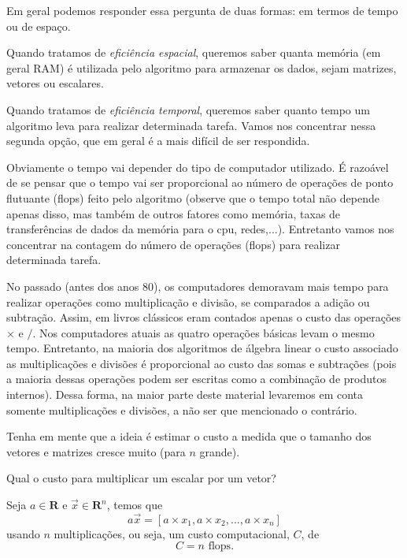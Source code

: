 Em geral podemos responder essa pergunta de duas formas: em termos de tempo ou de espaço.

Quando tratamos de \emph{eficiência espacial}, queremos saber quanta memória (em geral RAM) é utilizada pelo algoritmo para armazenar os dados, sejam matrizes, vetores ou escalares.

Quando tratamos de \emph{eficiência temporal}, queremos saber quanto tempo um algoritmo leva para realizar determinada tarefa. Vamos nos concentrar nessa segunda opção, que em geral é a mais difícil de ser respondida.

Obviamente o tempo vai depender do tipo de computador utilizado. É razoável de se pensar que o tempo vai ser proporcional ao número de operações de ponto flutuante (flops) feito pelo algoritmo (observe que o tempo total não depende apenas disso, mas também de outros fatores como memória, taxas de transferências de dados da memória para o cpu, redes,...). Entretanto vamos nos concentrar na contagem do número de operações (flops) para realizar determinada tarefa.

No passado (antes dos anos 80), os computadores demoravam mais tempo para realizar operações como multiplicação e divisão, se comparados a adição ou subtração. Assim, em livros clássicos eram contados apenas o custo das operações $\times$ e $/$. Nos computadores atuais as quatro operações básicas  levam o mesmo tempo. Entretanto, na maioria dos algoritmos de álgebra linear o custo associado as multiplicações e divisões é proporcional ao custo das somas e subtrações (pois a maioria dessas operações podem ser escritas como a combinação de produtos internos). Dessa forma, na maior parte deste material levaremos em conta somente multiplicações e divisões, a não ser que mencionado o contrário.

Tenha em mente que a ideia é estimar o custo a medida que o tamanho dos vetores e matrizes cresce muito (para $n$ grande).

\begin{ex}
Qual o custo para multiplicar um escalar por um vetor?
\end{ex}
\begin{sol}
Seja $a \in \mathbf{R}$ e $\vec{x} \in \mathbf{R}^n$, temos que
\begin{equation}
  a \vec{x} = [a\times x_1 , a\times x_2 , ... ,a\times x_n]
\end{equation}
usando $n$ multiplicações, ou seja, um custo computacional, $C$, de
\begin{equation}
  C = n \text{~flops}.
\end{equation}
\end{sol}

